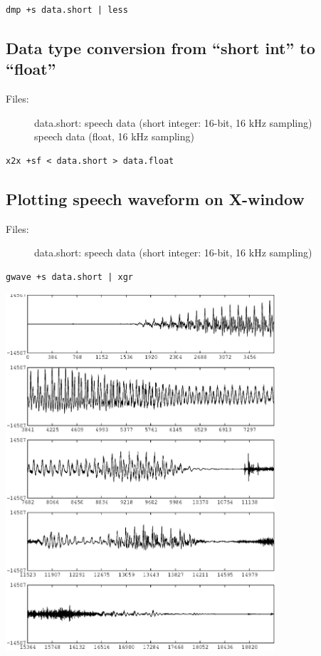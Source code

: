 \documentclass[a4paper,10pt]{article}
\begin{document}
\begin{verbatim}
dmp +s data.short | less
\end{verbatim}

\subsection{Data type conversion from ``short int'' to ``float''}

\begin{description}
\item[Files:]
  data.short: speech data (short integer: 16-bit, 16 kHz sampling)\\
  speech data (float, 16 kHz sampling)\\
\end{description}

\begin{verbatim}
x2x +sf < data.short > data.float
\end{verbatim}

\subsection{Plotting speech waveform on X-window}

\begin{description}
\item[Files:]
  data.short: speech data (short integer: 16-bit, 16 kHz sampling)
\end{description}

\begin{verbatim}
gwave +s data.short | xgr
\end{verbatim}

\includegraphics[width=10cm]{data.gwave.eps}
\end{document}
